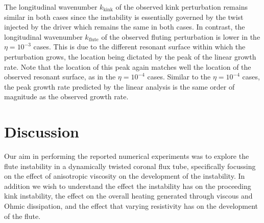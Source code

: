 \documentclass[fleqn,usenatbib]{mnras}
\newcommand{\rev}[1]{{\color{red} #1}}
\begin{document}
The longitudinal wavenumber $k_{\text{kink}}$ of the observed kink perturbation
remains similar in both cases since the instability is essentially governed by
the twist injected by the driver which remains the same in both cases. In
contrast, the longitudinal wavenumber $k_{\text{flute}}$ of the observed
fluting perturbation is lower in the $\eta=10^{-3}$ cases. This is due to the
different resonant surface within which the perturbation grows, the location
being dictated by the peak of the linear growth rate. Note that the location of
this peak again matches well the location of the observed resonant surface, as
in the $\eta=10^{-4}$ cases. Similar to the $\eta=10^{-4}$ cases, the peak
growth rate predicted by the linear analysis is the same order of magnitude as
the observed growth rate.

\section{Discussion}
\label{sec-discussion}

\rev{Our aim in performing the reported numerical experiments was to explore
the flute instability in a dynamically twisted coronal flux tube, specifically
focussing on the effect of anisotropic viscosity on the development of the
instability. In addition we wish to understand the effect the instability has
on the proceeding kink instability, the effect on the overall heating generated
through viscous and Ohmic dissipation, and the effect that varying resistivity
has on the development of the flute.}
\end{document}
